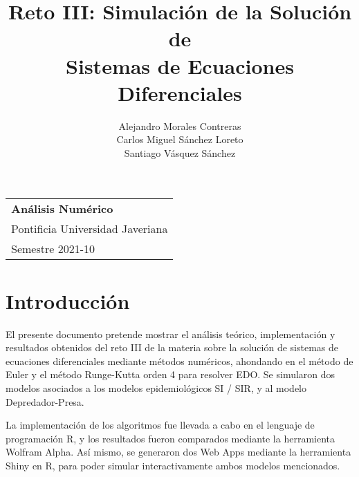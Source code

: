 \documentclass[a4paper,12pt]{article}
\begin{document}
\thispagestyle{empty}

\begin{tabular}{p{14cm}}
{\large \bf Análisis Numérico} \\
Pontificia Universidad Javeriana \\ Semestre 2021-10 \\
\hline
\end{tabular}

\title{Reto III: Simulación de la Solución de \\ Sistemas de Ecuaciones Diferenciales}
\author{Alejandro Morales Contreras \\ Carlos Miguel Sánchez Loreto \\ Santiago Vásquez Sánchez}
\date{}

\begingroup
\let\newpage\relax
\maketitle
\endgroup


\section{Introducción}


El presente documento pretende mostrar el análisis teórico, implementación y resultados obtenidos del reto III de la materia sobre la solución de sistemas de ecuaciones diferenciales mediante métodos numéricos, ahondando en el método de Euler y el método Runge-Kutta orden 4 para resolver EDO. Se simularon dos modelos asociados a los modelos epidemiológicos SI / SIR, y al modelo Depredador-Presa. \par

La implementación de los algoritmos fue llevada a cabo en el lenguaje de programación R, y los resultados fueron comparados mediante la herramienta Wolfram Alpha. Así mismo, se generaron dos Web Apps mediante la herramienta Shiny en R, para poder simular interactivamente ambos modelos mencionados.

\end{document}

